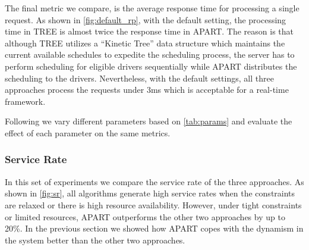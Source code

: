 The final metric we compare, is the average response time for processing a single request. As shown in \cref{fig:default_rp}, with the default setting, the processing time in TREE is almost twice the response time in APART. The reason is that although TREE utilizes a ``Kinetic Tree'' data structure which maintains the current available schedules to expedite the scheduling process, the server has to perform scheduling for eligible drivers sequentially while APART distributes the scheduling to the drivers. Nevertheless, with the default settings, all three approaches process the requests under 3ms which is acceptable for a real-time framework.

Following we vary different parameters based on \cref{tab:params} and evaluate the effect of each parameter on the same metrics.

\subsubsection{Service Rate}
In this set of experiments we compare the service rate of the three approaches. As shown in \cref{fig:sr}, all algorithms generate high service rates when the constraints are relaxed or there is high resource availability. However, under tight constraints or limited resources, APART outperforms the other two approaches by up to 20\%. In the previous section we showed how APART copes with the dynamism in the system better than the other two approaches.

